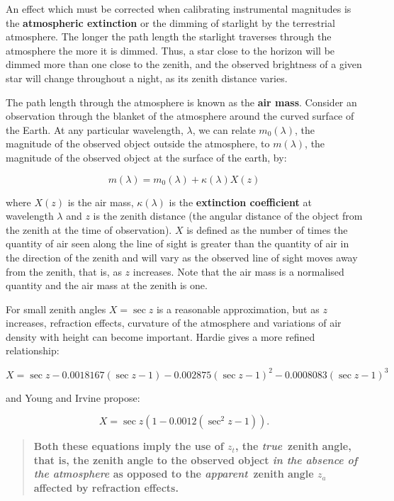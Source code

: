 \documentclass[twoside,11pt,nolof]{starlink}
\begin{document}
An effect which must be corrected when calibrating instrumental
magnitudes is the \textbf{atmospheric extinction} or the dimming of
starlight by the terrestrial atmosphere.  The longer the path length
the starlight traverses through the atmosphere the more it is
dimmed.  Thus, a star close to the horizon will be dimmed more than one
close to the zenith, and the observed brightness of a given star will
change throughout a night, as its zenith distance varies.

The path length through the atmosphere is known as the \textbf{air mass}.
Consider an observation through the blanket of the atmosphere around
the curved surface of the Earth. At any particular wavelength, $\lambda$,
we can relate $m_0(\lambda)$, the magnitude of the observed object
outside the atmosphere, to $m(\lambda)$, the magnitude of the observed
object at the surface of the earth, by:

\begin{equation}
m(\lambda) = m_0(\lambda)  + \kappa(\lambda)X(z)
\end{equation}

where $X(z)$ is the air mass, $\kappa(\lambda)$ is the \textbf{extinction
coefficient} at wavelength $\lambda$ and $z$ is the zenith distance (the
angular distance of the object from the zenith at the time of observation).
$X$ is defined as the number of times the quantity of air seen along the
line of sight is greater than the quantity of air in the direction of the
zenith and will vary as the observed line of sight moves away from the
zenith, that is, as $z$ increases.  Note that the air mass is a
normalised quantity and the air mass at the zenith is one.

For small zenith angles $X=\sec z$ is a reasonable approximation, but
as $z$ increases, refraction effects, curvature of the atmosphere and
variations of air density with height can become important.
Hardie\cite{HARDIE62} gives a more refined relationship:

\begin{equation}
X= \sec z - 0.0018167(\sec z -1) - 0.002875(\sec z -1)^2 -
0.0008083(\sec z -1)^3
\end{equation}

and Young and Irvine\cite{YOUNG67} propose:

\begin{equation}
X= \sec z \left( 1 - 0.0012 (\sec^2 z-1) \right) .
\end{equation}

\begin{quote}
\textbf{Both these equations imply the use of $z_t$, the \textit{true}\, zenith
angle, that is, the zenith angle to the observed object \textit{in the
absence of the atmosphere} as opposed to the \textit{apparent}\, zenith
angle $z_a$ affected by refraction effects.}
\end{quote}
\end{document}
